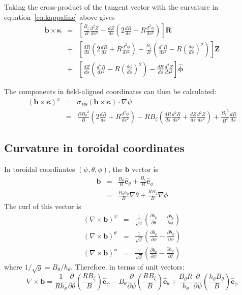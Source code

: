 \documentclass[12pt, a4paper]{article}
\newcommand{\dd}[2]{\ensuremath{\frac{d #1}{d #2}}}
\newcommand{\ddd}[2]{\ensuremath{\frac{d^2 #1}{d #2^2}}}
\newcommand{\deriv}[2]{\ensuremath{\frac{\partial #1}{\partial #2}}}
\newcommand{\hthe}{\ensuremath{h_\theta}}
\newcommand{\Bp}{\ensuremath{B_\theta}}
\newcommand{\Bt}{\ensuremath{B_\zeta}}
\newcommand{\Vec}[1]{\ensuremath{\mathbf{#1}}}
\newcommand{\bvec}{\Vec{b}}
\newcommand{\kvec}{\Vec{\kappa}}
\newcommand{\phivec}{\ensuremath{\hat{\Vec{\phi}}}}
\newcommand{\ehat}{\ensuremath{\hat{\Vec{e}}}}
\newcommand{\sbp}{\ensuremath{\sigma_{B\theta}}}
\begin{document}
Taking the cross-product of the tangent vector with the curvature in equation~\ref{eq:kappaline} above gives
\begin{eqnarray*}
  \bvec \times\kvec &=& \left[\frac{\Bt}{B}\ddd{Z}{s} - \dd{Z}{s}\left(2\dd{R}{s} + R\ddd{\phi}{s}\right)\right]\Vec{R} \\
  &+& \left[\dd{R}{s}\left(2\dd{R}{s} + R\ddd{\phi}{s}\right) - \frac{\Bt}{B}\left(\ddd{R}{s} - R\left(\dd{\phi}{s}\right)^2\right)\right]\Vec{Z} \\
  &+& \left[\dd{Z}{s}\left(\ddd{R}{s} - R\left(\dd{\phi}{s}\right)^2\right) - \dd{R}{s}\ddd{Z}{s}\right]\phivec
\end{eqnarray*}

The components in field-aligned coordinates can then be calculated:
\begin{eqnarray*}
\left(\bvec\times\kvec\right)^x &=& \sbp\left(\bvec\times\kvec\right)\cdot\nabla\psi \\
&=& \frac{R\Bp^2}{B}\left(2\dd{R}{s} + R\ddd{\phi}{s}\right) - R\Bt\left(\dd{R}{s}\ddd{R}{s} + \dd{Z}{s}\ddd{Z}{s}\right) + \frac{\Bt^3}{B^2}\dd{R}{s}
\end{eqnarray*}

\subsection{Curvature in toroidal coordinates}

In toroidal coordinates $\left(\psi,\theta,\phi\right)$, the $\bvec$ vector
is
\begin{eqnarray*}
\bvec &=& \frac{\Bp}{B}\ehat_\theta + \frac{\Bt}{B}\ehat_\phi \\
&=& \frac{\Bp\hthe}{B}\nabla\theta + \frac{R\Bt}{B}\nabla\phi
\end{eqnarray*}
The curl of this vector is
\begin{eqnarray*}
\left(\nabla\times\bvec\right)^\psi &=& \frac{1}{\sqrt{g}}\left(\deriv{b_\phi}{\theta} - \deriv{b_\theta}{\phi}\right) \\
\left(\nabla\times\bvec\right)^\theta &=& \frac{1}{\sqrt{g}}\left(\deriv{b_\psi}{\phi} - \deriv{b_\phi}{\psi}\right) \\
\left(\nabla\times\bvec\right)^\phi &=& \frac{1}{\sqrt{g}}\left(\deriv{b_\theta}{\psi} - \deriv{b_\psi}{\theta}\right)
\end{eqnarray*}
where $1/\sqrt{g} = \Bp/\hthe$. Therefore, in terms of unit vectors:
\[
\nabla\times\bvec = \frac{1}{R\hthe}\deriv{}{\theta}\left(\frac{R\Bt}{B}\right)\ehat_\psi - \Bp\deriv{}{\psi}\left(\frac{R\Bt}{B}\right)\ehat_\theta + \frac{\Bp R}{\hthe}\deriv{}{\psi}\left(\frac{\hthe\Bp}{B}\right)\ehat_\phi
\]
\end{document}
